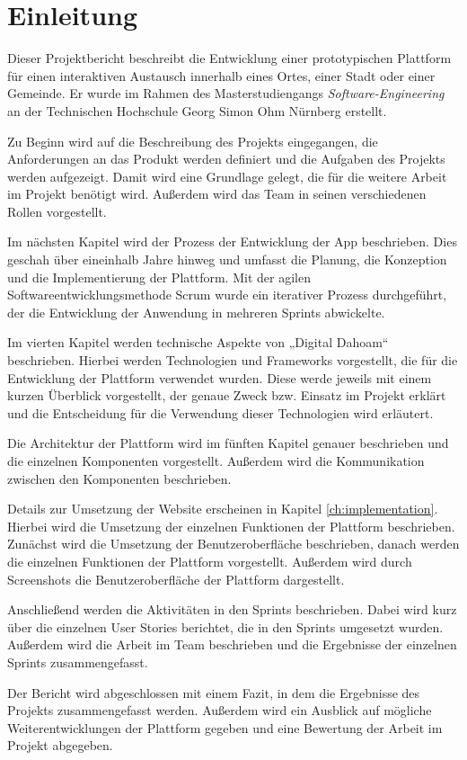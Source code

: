 \chapter{Einleitung}
\label{ch:introduction}

Dieser Projektbericht beschreibt die Entwicklung einer prototypischen Plattform für einen interaktiven Austausch innerhalb eines Ortes, einer Stadt oder einer Gemeinde.
Er wurde im Rahmen des Masterstudiengangs \textit{Software-Engineering} an der Technischen Hochschule Georg Simon Ohm Nürnberg erstellt.

Zu Beginn wird auf die Beschreibung des Projekts eingegangen, die Anforderungen an das Produkt werden definiert und die Aufgaben des Projekts werden aufgezeigt.
Damit wird eine Grundlage gelegt, die für die weitere Arbeit im Projekt benötigt wird. Außerdem wird das Team in seinen verschiedenen Rollen vorgestellt.

Im nächsten Kapitel wird der Prozess der Entwicklung der App beschrieben.
Dies geschah über eineinhalb Jahre hinweg und umfasst die Planung, die Konzeption und die Implementierung der Plattform.
Mit der agilen Softwareentwicklungsmethode Scrum wurde ein iterativer Prozess durchgeführt, der die Entwicklung der Anwendung in mehreren Sprints abwickelte.

Im vierten Kapitel werden technische Aspekte von „Digital Dahoam“ beschrieben.
Hierbei werden Technologien und Frameworks vorgestellt, die für die Entwicklung der Plattform verwendet wurden.
Diese werde jeweils mit einem kurzen Überblick vorgestellt, der genaue Zweck bzw. Einsatz im Projekt erklärt und die Entscheidung für die Verwendung dieser Technologien wird erläutert.

Die Architektur der Plattform wird im fünften Kapitel genauer beschrieben und die einzelnen Komponenten vorgestellt.
Außerdem wird die Kommunikation zwischen den Komponenten beschrieben.

Details zur Umsetzung der Website erscheinen in Kapitel \ref{ch:implementation}.
Hierbei wird die Umsetzung der einzelnen Funktionen der Plattform beschrieben.
Zunächst wird die Umsetzung der Benutzeroberfläche beschrieben, danach werden die einzelnen Funktionen der Plattform vorgestellt.
Außerdem wird durch Screenshots die Benutzeroberfläche der Plattform dargestellt.

Anschließend werden die Aktivitäten in den Sprints beschrieben.
Dabei wird kurz über die einzelnen User Stories berichtet, die in den Sprints umgesetzt wurden.
Außerdem wird die Arbeit im Team beschrieben und die Ergebnisse der einzelnen Sprints zusammengefasst.

Der Bericht wird abgeschlossen mit einem Fazit, in dem die Ergebnisse des Projekts zusammengefasst werden.
Außerdem wird ein Ausblick auf mögliche Weiterentwicklungen der Plattform gegeben und eine Bewertung der Arbeit im Projekt abgegeben.
